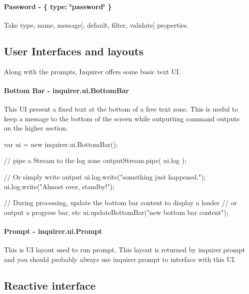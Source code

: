  



\paragraph*{Password -\/ {\ttfamily \{ type\+: \char`\"{}password\char`\"{} \}}}

Take {\ttfamily type}, {\ttfamily name}, {\ttfamily message}\mbox{[}, {\ttfamily default}, {\ttfamily filter}, {\ttfamily validate}\mbox{]} properties.



\subsection*{User Interfaces and layouts}

Along with the prompts, Inquirer offers some basic text UI.

\paragraph*{Bottom Bar -\/ {\ttfamily inquirer.\+ui.\+Bottom\+Bar}}

This UI present a fixed text at the bottom of a free text zone. This is useful to keep a message to the bottom of the screen while outputting command outputs on the higher section.


\begin{DoxyCode}
var ui = new inquirer.ui.BottomBar();

// pipe a Stream to the log zone
outputStream.pipe( ui.log );

// Or simply write output
ui.log.write("something just happened.");
ui.log.write("Almost over, standby!");

// During processing, update the bottom bar content to display a loader
// or output a progress bar, etc
ui.updateBottomBar("new bottom bar content");
\end{DoxyCode}


\paragraph*{Prompt -\/ {\ttfamily inquirer.\+ui.\+Prompt}}

This is UI layout used to run prompt. This layout is returned by {\ttfamily inquirer.\+prompt} and you should probably always use {\ttfamily inquirer.\+prompt} to interface with this UI.

\subsection*{Reactive interface}

